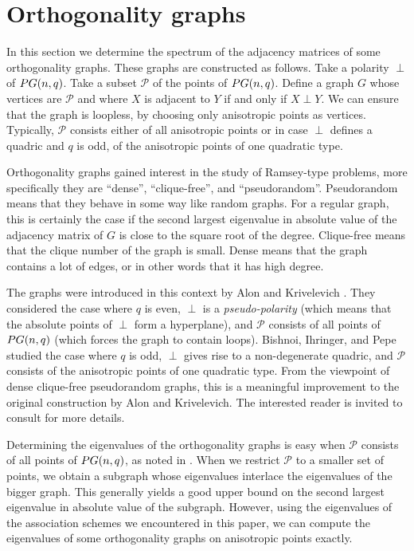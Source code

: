 \documentclass[a4paper]{article}
\theoremstyle{definition}
\newcommand{\pg}{\textnormal{PG}}
\newcommand{\pp}{\mathcal P}
\begin{document}
\section{Orthogonality graphs}
 \label{Sec:Ortho}

In this section we determine the spectrum of the adjacency matrices of some orthogonality graphs.
These graphs are constructed as follows.
Take a polarity $\perp$ of $\pg(n,q)$.
Take a subset $\pp$ of the points of $\pg(n,q)$.
Define a graph $G$ whose vertices are $\pp$ and where $X$ is adjacent to $Y$ if and only if $X \perp Y$.
We can ensure that the graph is loopless, by choosing only anisotropic points as vertices.
Typically, $\pp$ consists either of all anisotropic points or in case $\perp$ defines a quadric and $q$ is odd, of the anisotropic points of one quadratic type.

Orthogonality graphs gained interest in the study of Ramsey-type problems, more specifically they are ``dense'', ``clique-free'', and ``pseudorandom''.
Pseudorandom means that they behave in some way like random graphs.
For a regular graph, this is certainly the case if the second largest eigenvalue in absolute value of the adjacency matrix of $G$ is close to the square root of the degree.
Clique-free means that the clique number of the graph is small.
Dense means that the graph contains a lot of edges, or in other words that it has high degree.

The graphs were introduced in this context by Alon and Krivelevich \cite{AlonKrivelevich}.
They considered the case where $q$ is even, $\perp$ is a \emph{pseudo-polarity} (which means that the absolute points of $\perp$ form a hyperplane), and $\pp$ consists of all points of $\pg(n,q)$ (which forces the graph to contain loops).
Bishnoi, Ihringer, and Pepe \cite{BishnoiIhringerPepe} studied the case where $q$ is odd, $\perp$ gives rise to a non-degenerate quadric, and $\pp$ consists of the anisotropic points of one quadratic type.
From the viewpoint of dense clique-free pseudorandom graphs, this is a meaningful improvement to the original construction by Alon and Krivelevich.
The interested reader is invited to consult \cite{BishnoiIhringerPepe} for more details.

Determining the eigenvalues of the orthogonality graphs is easy when $\pp$ consists of all points of $\pg(n,q)$, as noted in \cite{AlonKrivelevich}.
When we restrict $\pp$ to a smaller set of points, we obtain a subgraph whose eigenvalues interlace the eigenvalues of the bigger graph.
This generally yields a good upper bound on the second largest eigenvalue in absolute value of the subgraph.
However, using the eigenvalues of the association schemes we encountered in this paper, we can compute the eigenvalues of some orthogonality graphs on anisotropic points exactly.
\end{document}
